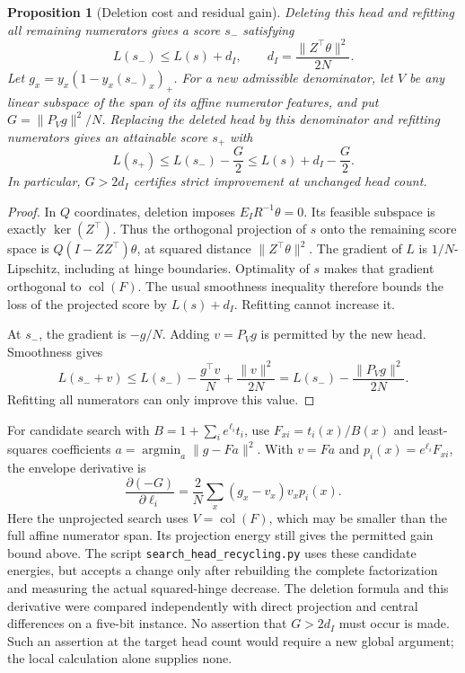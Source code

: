 \documentclass[11pt]{article}
\newtheorem{proposition}{Proposition}
\begin{document}
\begin{proposition}[Deletion cost and residual gain]
Deleting this head and refitting all remaining numerators gives a score
$s_-$ satisfying
\[
 L(s_-)\le L(s)+d_I,\qquad
 d_I=\frac{\|Z^{\top}\theta\|^2}{2N}.
\]
Let $g_x=y_x(1-y_x(s_-)_x)_+$. For a new admissible denominator,
let $V$ be any linear subspace of the span of its affine numerator
features, and put
$G=\|P_Vg\|^2/N$. Replacing the deleted head by this denominator and
refitting numerators gives an attainable score $s_+$ with
\[
 L(s_+)\le L(s_-)-\frac G2
          \le L(s)+d_I-\frac G2.
\]
In particular, $G>2d_I$ certifies strict improvement at unchanged head
count.
\end{proposition}
\begin{proof}
In $Q$ coordinates, deletion imposes
$E_IR^{-1}\theta=0$. Its feasible subspace is exactly
$\ker(Z^{\top})$. Thus the orthogonal projection of $s$ onto the
remaining score space is $Q(I-ZZ^{\top})\theta$, at squared distance
$\|Z^{\top}\theta\|^2$. The gradient of $L$ is $1/N$-Lipschitz,
including at hinge boundaries. Optimality of $s$ makes that gradient
orthogonal to $\operatorname{col}(F)$. The usual smoothness inequality
therefore bounds the loss of the projected score by $L(s)+d_I$.
Refitting cannot increase it.

At $s_-$, the gradient is $-g/N$. Adding $v=P_Vg$ is permitted by
the new head. Smoothness gives
\[
 L(s_-+v)\le L(s_-)-\frac{g^{\top}v}{N}
                       +\frac{\|v\|^2}{2N}
             =L(s_-)-\frac{\|P_Vg\|^2}{2N}.
\]
Refitting all numerators can only improve this value.
\end{proof}

For candidate search with $B=1+\sum_i e^{\ell_i}t_i$, use
$F_{xi}=t_i(x)/B(x)$ and least-squares coefficients
$a=\operatorname*{argmin}_a\|g-Fa\|^2$. With $v=Fa$ and
$p_i(x)=e^{\ell_i}F_{xi}$, the envelope derivative is
\[
 \frac{\partial(-G)}{\partial\ell_i}
 =\frac2N\sum_x(g_x-v_x)v_xp_i(x).
\]
Here the unprojected search uses $V=\operatorname{col}(F)$, which may
be smaller than the full affine numerator span. Its projection energy
still gives the permitted gain bound above.
The script \texttt{search\_head\_recycling.py} uses these candidate
energies, but accepts a change only after rebuilding the complete
factorization and measuring the actual squared-hinge decrease. The
deletion formula and this derivative were compared independently with
direct projection and central differences on a five-bit instance.
No assertion that $G>2d_I$ must occur is made. Such an assertion at the
target head count would require a new global argument; the local
calculation alone supplies none.
\end{document}
